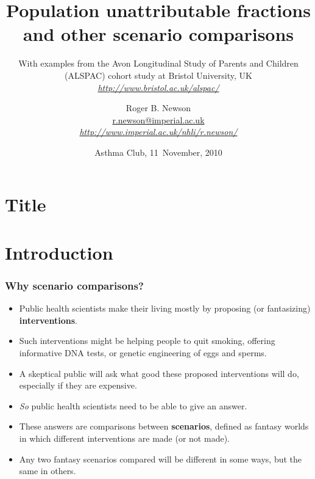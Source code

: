 \documentclass[11pt]{beamer}
\title[Population unattributable fractions and other scenario comparisons] %
{\textbf{Population unattributable fractions and other scenario comparisons}}
\subtitle
{\scriptsize With examples from the Avon Longitudinal Study of Parents and Children (ALSPAC) cohort study at Bristol University, UK
\\ \href{http://www.bristol.ac.uk/alspac/}{\textsl{http://www.bristol.ac.uk/alspac/}}
}
\author[Author, Another] %
{
Roger B. Newson
\\ \href{mailto:r.newson@imperial.ac.uk}{r.newson@imperial.ac.uk}
\\ \href{http://www.imperial.ac.uk/nhli/r.newson/}{\textsl{http://www.imperial.ac.uk/nhli/r.newson/}}
}
\institute[National Heart and Lung Institute, Imperial College London]
{
National Heart and Lung Institute\\
Imperial College London
}
\date[Asthma Club 2010] %
{
Asthma Club, 11~November, 2010
}
\begin{document}
\section{Title}

\begin{frame}
  \titlepage
\end{frame}

\section{Introduction}


\begin{frame}
\frametitle{Why scenario comparisons?}

\begin{itemize}

\item<2-> Public health scientists make their living mostly by proposing (or fantasizing) \textbf{interventions}.

\item<3-> Such interventions might be helping people to quit smoking, offering informative DNA tests,
or genetic engineering of eggs and sperms.

\item<4-> A skeptical public will ask what good these proposed interventions will do,
especially if they are expensive.

\item<5-> \textit{So} public health scientists need to be able to give an answer.

\item<6-> These answers are comparisons between \textbf{scenarios},
defined as fantasy worlds in which different interventions are made (or not made).

\item<7-> Any two fantasy scenarios compared will be different in some ways, but the same in others.

\end{itemize}

\end{frame}
\end{document}
